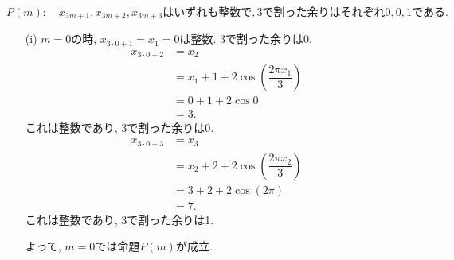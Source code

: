 \documentclass[dvipdfmx,a4paper]{jsarticle}
\newcommand{\2}{I\hspace{-1pt}I}
\newcommand{\3}{I\hspace{-1pt}I\hspace{-1pt}I}
\begin{document}
    \begin{equation*}
        P(m): \quad x_{3m+1}, x_{3m+2}, x_{3m+3}
        \mathrm{はいずれも整数で, 3で割った余りはそれぞれ0, 0, 1である. }
    \end{equation*}
    
    
    \begin{itemize}
        \item [(i)] $m=0$の時, $x_{3\cdot 0 + 1} = x_1 = 0$は整数. 3で割った余りは0. 
        \begin{align*}
            x_{3\cdot 0 + 2} &= x_2 \\
            &= x_1 + 1 + 2\cos\left( \dfrac{2\pi x_1}{3} \right)\\
            &= 0 + 1 + 2 \cos 0\\
            &=3. 
        \end{align*}
        これは整数であり, 3で割った余りは0. 
        \begin{align*}
            x_{3\cdot 0 + 3} &= x_3 \\
            &= x_2 + 2  + 2\cos\left( \dfrac{2\pi x_2}{3} \right)\\
            &= 3 + 2 + 2 \cos \left(2\pi \right) \\
            &=7. 
        \end{align*}
        これは整数であり, 3で割った余りは1. 

        よって, $m=0$では命題$P(m)$が成立. 


\end{itemize}
\end{document}
